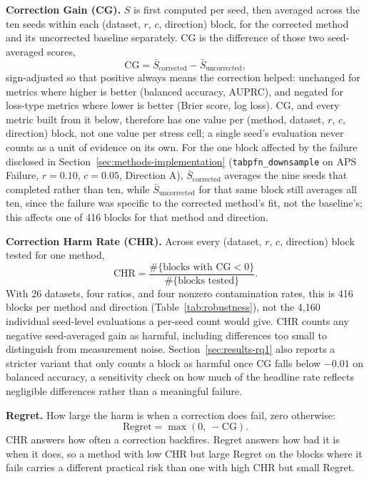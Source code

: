 \textbf{Correction Gain (CG).} $S$ is first computed per seed, then
averaged across the ten seeds within each (dataset, $r$, $c$, direction)
block, for the corrected method and its uncorrected baseline separately.
CG is the difference of those two seed-averaged scores,
\begin{equation}
\text{CG} = \bar{S}_{\text{corrected}} - \bar{S}_{\text{uncorrected}},
\label{eq:cg}
\end{equation}
sign-adjusted so that positive always means the correction helped: unchanged
for metrics where higher is better (balanced accuracy, AUPRC), and negated
for loss-type metrics where lower is better (Brier score, log loss). CG,
and every metric built from it below, therefore has one value per (method,
dataset, $r$, $c$, direction) block, not one value per stress cell; a
single seed's evaluation never counts as a unit of evidence on its own.
For the one block affected by the failure disclosed in
Section~\ref{sec:methods-implementation} (\texttt{tabpfn\_downsample} on
APS Failure, $r{=}0.10$, $c{=}0.05$, Direction A), $\bar{S}_{\text{corrected}}$
averages the nine seeds that completed rather than ten, while
$\bar{S}_{\text{uncorrected}}$ for that same block still averages all ten,
since the failure was specific to the corrected method's fit, not the
baseline's; this affects one of 416 blocks for that method and direction.

\textbf{Correction Harm Rate (CHR).} Across every (dataset, $r$, $c$,
direction) block tested for one method,
\begin{equation}
\text{CHR} = \frac{\#\{\text{blocks with CG} < 0\}}{\#\{\text{blocks tested}\}}.
\label{eq:chr}
\end{equation}
With 26 datasets, four ratios, and four nonzero contamination rates, this
is 416 blocks per method and direction (Table~\ref{tab:robustness}), not
the 4,160 individual seed-level evaluations a per-seed count would give.
CHR counts any negative seed-averaged gain as harmful, including
differences too small to distinguish from measurement noise.
Section~\ref{sec:results-rq1} also
reports a stricter variant that only counts a block as harmful once CG
falls below $-0.01$ on balanced accuracy, a sensitivity check on how much
of the headline rate reflects negligible differences rather than a
meaningful failure.

\textbf{Regret.} How large the harm is when a correction does fail, zero
otherwise:
\begin{equation}
\text{Regret} = \max(0,\ -\text{CG}).
\label{eq:regret}
\end{equation}
CHR answers how often a correction backfires. Regret answers how bad it is
when it does, so a method with low CHR but large Regret on the blocks where it
fails carries a different practical risk than one with high CHR but small
Regret.


